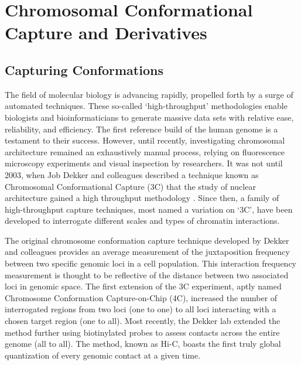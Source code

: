 

\chapter{Chromosomal Conformational Capture and Derivatives}

\section{Capturing Conformations}

The field of molecular biology is advancing rapidly, propelled forth by a
surge of automated techniques.  These so-called `high-throughput' methodologies
enable biologists and bioinformaticians to generate massive data sets with
relative ease, reliability, and efficiency.  The first reference build of the
human genome is a testament to their success\cite{hgsc2004}.  However,
until recently, investigating chromosomal architecture remained an
exhaustively manual process, relying on fluorescence microscopy experiments and
visual inspection by researchers.  It was not until 2003, when Job Dekker and
colleagues described a technique known as Chromosomal Conformational Capture
(3C) that the study of nuclear architecture gained a high throughput methodology
\cite{dekker2002}. Since then, a family of high-throughput capture techniques,
most named a variation on `3C', have been developed to interrogate
different scales and types of chromatin interactions.

The original chromosome conformation capture technique developed by Dekker and
colleagues provides an average measurement of the juxtaposition frequency between
two specific genomic loci in a cell population\cite{frase2014}.  This
interaction frequency measurement is thought to be reflective of the distance
between two associated loci in genomic space.  The first extension of the 3C
experiment, aptly named Chromosome Conformation Capture-on-Chip (4C), increased
the number of interrogated regions from two loci (one to one) to all loci
interacting with a chosen target region (one to all)\cite{simonis2006}.  Most
recently, the Dekker lab extended the method further using biotinylated probes
to assess contacts across the entire genome (all to all)\cite{berkum2010}.
The method, known as Hi-C, boasts the first truly global quantization of every
genomic contact at a given time.

